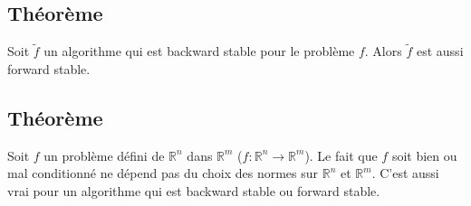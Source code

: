 \documentclass{article}
\newcommand{\R}{\mathbb{R}}
\begin{document}
\subsection{}
\subsection{Théorème}
Soit $\tilde{f}$ un algorithme qui est backward stable pour le problème $f$. Alors $\tilde{f}$ est aussi forward stable.
\subsection{Théorème}
Soit $f$ un problème défini de ${\R}^n$ dans ${\R}^m$ ($f: {\R}^n \rightarrow {\R}^m$). Le fait que $f$ soit bien ou mal conditionné ne dépend pas
du choix des normes sur ${\R}^n$ et ${\R}^m$. C'est aussi vrai pour un algorithme qui est backward stable ou forward stable.
\end{document}
